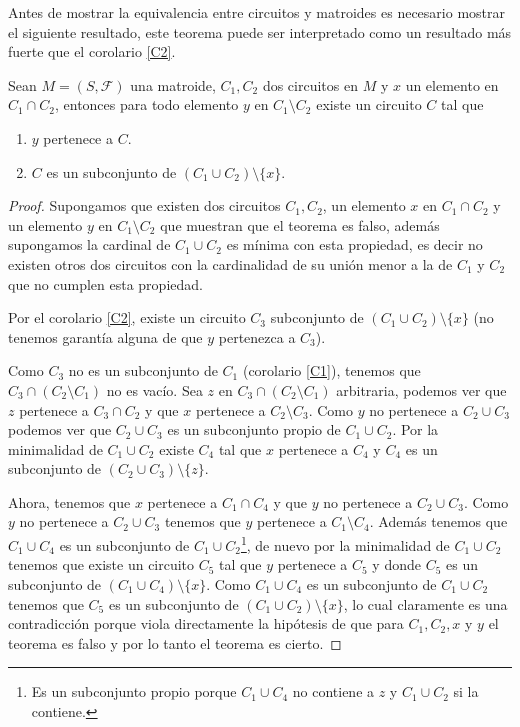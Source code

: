 Antes de mostrar la equivalencia entre circuitos y matroides es necesario mostrar el siguiente resultado, este teorema puede ser interpretado como un resultado más fuerte que el corolario \ref{C2}.

\begin{teo} \label{C3}
Sean $M=(S,\mathcal{F})$ una matroide, $C_1, C_2$ dos circuitos en $M$ y $x$ un elemento en $C_1 \cap C_2$, entonces para todo elemento $y$ en $C_1 \setminus C_2$ existe un circuito $C$ tal que 
\begin{enumerate}
\item $y$ pertenece a $C$.
\item $C$ es un subconjunto de $(C_1 \cup C_2) \setminus \{x\}$.
\end{enumerate}
\end{teo}

\begin{proof}
Supongamos que existen dos circuitos $C_1,C_2$, un elemento $x$ en $C_1 \cap C_2$ y un elemento $y$ en $C_1 \setminus C_2$ que muestran que el teorema es falso, además supongamos la cardinal de $C_1 \cup C_2$ es mínima con esta propiedad, es decir no existen otros dos circuitos con la cardinalidad de su unión menor a la de $C_1$ y $C_2$ que no cumplen esta propiedad. 

Por el corolario \ref{C2}, existe un circuito $C_3$ subconjunto de $(C_1 \cup C_2)\setminus \{x\}$ (no tenemos garantía alguna de que $y$ pertenezca a $C_3$). 

Como $C_3$ no es un subconjunto de $C_1$ (corolario \ref{C1}), tenemos que $C_3 \cap (C_2\setminus C_1)$ no es vacío. Sea $z$ en $C_3 \cap (C_2\setminus C_1)$ arbitraria, podemos ver que $z$ pertenece a $C_3 \cap C_2$ y que $x$ pertenece a $C_2 \setminus C_3$. Como $y$ no pertenece a $C_2 \cup C_3$ podemos ver que $C_2 \cup C_3$ es un subconjunto propio de $C_1 \cup C_2$. Por la minimalidad de $C_1 \cup C_2$ existe $C_4$ tal que $x$ pertenece a $C_4$ y $C_4$ es un subconjunto de $(C_2 \cup C_3) \setminus \{z\}$. 

Ahora, tenemos que $x$ pertenece a $C_1 \cap C_4$ y que $y$ no pertenece a $C_2 \cup C_3$. Como $y$ no pertenece a $C_2 \cup C_3$ tenemos que $y$ pertenece a $C_1 \setminus C_4$. Además tenemos que $C_1 \cup C_4$ es un subconjunto de $C_1 \cup C_2$\footnote{Es un subconjunto propio porque $C_1 \cup C_4$ no contiene a $z$ y $C_1 \cup C_2$ si la contiene.}, de nuevo por la minimalidad de $C_1 \cup C_2$ tenemos que existe un circuito $C_5$ tal que $y$ pertenece a $C_5$ y donde $C_5$ es un subconjunto de $(C_1 \cup C_4) \setminus \{x\}$. Como $C_1 \cup C_4$ es un subconjunto de $C_1 \cup C_2$ tenemos que $C_5$ es un subconjunto de $(C_1 \cup C_2) \setminus \{x\}$, lo cual claramente es una contradicción porque viola directamente la hipótesis de que para $C_1,C_2,x$ y $y$ el teorema es falso y por lo tanto el teorema es cierto. 
\end{proof}

